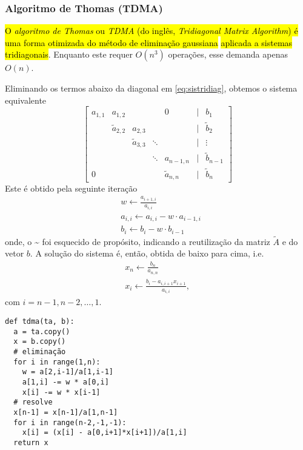 \subsubsection{Algoritmo de Thomas (TDMA)}

\hl{O \emph{algoritmo de Thomas}{\thomas} ou \emph{TDMA} (do inglês, \textit{Tridiagonal Matrix Algorithm}) é uma forma otimizada do método de eliminação gaussiana}{\gauss}\hl{ aplicada a sistemas tridiagonais}. Enquanto este requer $O(n^3)$ operações, esse demanda apenas $O(n)$.

Eliminando os termos abaixo da diagonal em \eqref{eq:sistridiag}, obtemos o sistema equivalente
\begin{equation}
  \begin{bmatrix}
    a_{1,1} & a_{1,2} & & & 0 & | & b_1\\
      & \tilde{a}_{2,2} & a_{2,3} & & & | & \tilde{b}_2\\
    &  & \tilde{a}_{3,3} & \ddots & & | & \vdots \\
    & & & \ddots & a_{n-1,n} & | & \tilde{b}_{n-1}\\
    0 & & & & \tilde{a}_{n,n} & | & \tilde{b}_n
  \end{bmatrix}
\end{equation}
Este é obtido pela seguinte iteração
\begin{align}
  & w \leftarrow \frac{a_{i+1,i}}{a_{i,i}}\\
  & a_{i,i} \leftarrow a_{i,i} - w\cdot a_{i-1,i}\\
  & b_i \leftarrow b_i - w\cdot b_{i-1}
\end{align}
onde, o {\textasciitilde} foi esquecido de propósito, indicando a reutilização da matriz $\tilde{A}$ e do vetor $b$. A solução do sistema é, então, obtida de baixo para cima, i.e.
\begin{gather}
  x_n \leftarrow \frac{b_n}{a_{n,n}}\\
  x_i \leftarrow \frac{b_i - a_{i,i+1}x_{i+1}}{a_{i,i}},
\end{gather}
com $i=n-1,n-2,\dotsc,1$.

\begin{lstlisting}[caption=tdma.py, label={py:tdma}]
def tdma(ta, b):
  a = ta.copy()
  x = b.copy()
  # eliminação
  for i in range(1,n):
    w = a[2,i-1]/a[1,i-1]
    a[1,i] -= w * a[0,i]
    x[i] -= w * x[i-1]
  # resolve
  x[n-1] = x[n-1]/a[1,n-1]
  for i in range(n-2,-1,-1):
    x[i] = (x[i] - a[0,i+1]*x[i+1])/a[1,i]
  return x
\end{lstlisting}


